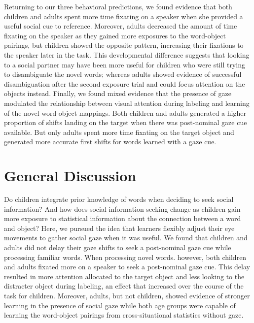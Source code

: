 \documentclass[10pt, letterpaper]{article}
\begin{document}
Returning to our three behavioral predictions, we found evidence that
both children and adults spent more time fixating on a speaker when she
provided a useful social cue to reference. Moreover, adults decreased
the amount of time fixating on the speaker as they gained more exposures
to the word-object pairings, but children showed the opposite pattern,
increasing their fixations to the speaker later in the task. This
developmental difference suggests that looking to a social partner may
have been more useful for children who were still trying to disambiguate
the novel words; whereas adults showed evidence of successful
disambiguation after the second exposure trial and could focus attention
on the objects instead. Finally, we found mixed evidence that the
presence of gaze modulated the relationship between visual attention
during labeling and learning of the novel word-object mappings. Both
children and adults generated a higher proportion of shifts landing on
the target when there was post-nominal gaze cue available. But only
adults spent more time fixating on the target object and generated more
accurate first shifts for words learned with a gaze cue.

\hypertarget{general-discussion}{%
\section{General Discussion}\label{general-discussion}}

Do children integrate prior knowledge of words when deciding to seek
social information? And how does social information seeking change as
children gain more exposure to statistical information about the
connection between a word and object? Here, we pursued the idea that
learners flexibly adjust their eye movements to gather social gaze when
it was useful. We found that children and adults did not delay their
gaze shifts to seek a post-nominal gaze cue while processing familiar
words. When processing novel words. however, both children and adults
fixated more on a speaker to seek a post-nominal gaze cue. This delay
resulted in more attention allocated to the target object and less
looking to the distracter object during labeling, an effect that
increased over the course of the task for children. Moreover, adults,
but not children, showed evidence of stronger learning in the presence
of social gaze while both age groups were capable of learning the
word-object pairings from cross-situational statistics without gaze.
\end{document}
